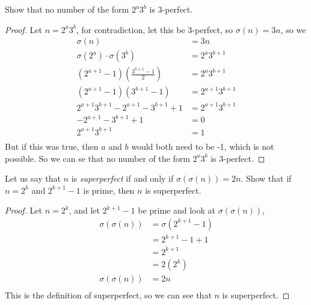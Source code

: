 \documentclass[11pt]{article}
\newenvironment{problem}[2][Problem]{\begin{trivlist}
\item[\hskip \labelsep {\bfseries #1}\hskip \labelsep {\bfseries #2.}]}{\end{trivlist}}
\begin{document}
\begin{problem}{6}
Show that no number of the form $2^a3^b$ is 3-perfect.
\end{problem}

\begin{proof}
  Let $n=2^a 3^b$, for contradiction, let this be 3-perfect, so $\sigma(n)=3n$, so we
  \begin{align*}
    \sigma(n)                                     & = 3n              \\
    \sigma(2^a) \cdot \sigma(3^b)                 & = 2^a 3^{b+1}     \\
    (2^{a+1} -1) \left(\frac{3^{b+1}-1}{2}\right) & = 2^a 3^{b+1}     \\
    (2^{a+1} -1) (3^{b+1}-1)                      & = 2^{a+1} 3^{b+1} \\
    2^{a+1}3^{b+1} - 2^{a+1} -3^{b+1} +1          & = 2^{a+1} 3^{b+1} \\
    - 2^{a+1} -3^{b+1} +1                         & = 0               \\
    2^{a+1} 3^{b+1}                               & = 1               \\
  \end{align*}
  But if this was true, then $a$ and $b$ would both need to be -1, which is not possible. So we can se that no number of the form $2^a3^b$ is 3-perfect.
\end{proof}



\begin{problem}{7}
Let us say that $n$ is \textit{superperfect} if and only if $\sigma(\sigma(n))=2n$. Show that if $n=2^k$ and $2^{k+1}-1$ is prime, then $n$ is superperfect.
\end{problem}

\begin{proof}
  Let $n=2^k$, and let $2^{k+1}-1$ be prime and look at $\sigma(\sigma(n))$,
  \begin{align*}
    \sigma(\sigma(n)) & = \sigma (2^{k+1} -1) \\
                      & = 2^{k+1} -1 + 1      \\
                      & = 2^{k+1}             \\
                      & =  2(2^{k})           \\
    \sigma(\sigma(n)) & =  2n                 \\
  \end{align*}
  This is the definition of superperfect, so we can see that $n$ is superperfect.
\end{proof}
\end{document}
